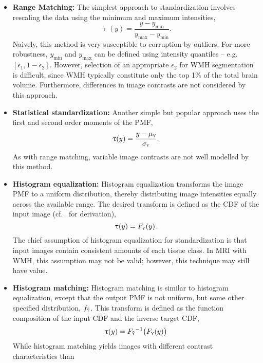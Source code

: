\begin{itemize}
  \item \textbf{Range Matching:}
  The simplest approach to standardization involves
  rescaling the data using the minimum and maximum intensities,
  \begin{equation}
    \uptau(y) = \frac{y-y_{\min}}{y_{\max}-y_{\min}}.
  \end{equation}
  Naively, this method is very susceptible to corruption by outliers.
  For more robustness, $y_{\min}$ and $y_{\max}$ can be defined using intensity quantiles
  -- e.g.\ $[\epsilon_1,1-\epsilon_2]$.
  However, selection of an appropriate $\epsilon_2$ for WMH segmentation is difficult,
  since WMH typically constitute only the top 1\% of the total brain volume.
  Furthermore, differences in image contrasts are not considered by this approach.
  \item \textbf{Statistical standardization:}
  Another simple but popular approach uses the first and second order moments of the PMF,
  \begin{equation}
    \uptau(y) = \frac{y-\mu_{\textsc{y}}}{\sigma_{\textsc{y}}}.
  \end{equation}
  As with range matching, variable image contrasts are not well modelled by this method.
  \item \textbf{Histogram equalization:}
  Histogram equalization transforms the image PMF to a uniform distribution,
  thereby distributing image intensities equally across the available range.
  The desired transform  is defined as the CDF of the input image
  (cf.~\cite{Gonzalez2006} for derivation),
  \begin{equation}
    \uptau(y) = F_{\textsc{y}}(y).
  \end{equation}
  The chief assumption of histogram equalization for standardization is
  that input images contain consistent amounts of each tissue class.
  In MRI with WMH, this assumption may not be valid;
  however, this technique may still have value.
  \item \textbf{Histogram matching:}
  Histogram matching is similar to histogram equalization, except that
  the output PMF is not uniform, but some other specified distribution, $f_{\tilde{\textsc{y}}}$.
  This transform is defined as
  the function composition of the input CDF and the inverse target CDF,
  \begin{equation}
    \uptau(y) = {F_{\tilde{\textsc{y}}}}^{-1}\big(F_{\textsc{y}}(y)\big)
  \end{equation}
  While histogram matching yields images with different contrast characteristics than

\end{itemize}
